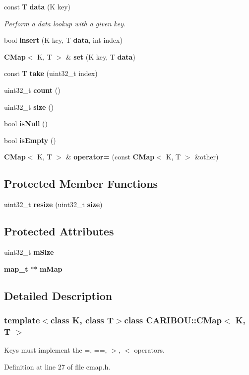 \begin{DoxyCompactItemize}
const T {\bf data} (K key)
\begin{DoxyCompactList}\small\item\em Perform a data lookup with a given key. \end{DoxyCompactList}\item 
bool {\bf insert} (K key, T {\bf data}, int index)
\item 
{\bf C\-Map}$<$ K, T $>$ \& {\bf set} (K key, T {\bf data})
\item 
const T {\bf take} (uint32\-\_\-t index)
\item 
uint32\-\_\-t {\bf count} ()
\item 
uint32\-\_\-t {\bf size} ()
\item 
bool {\bf is\-Null} ()
\item 
bool {\bf is\-Empty} ()
\item 
{\bf C\-Map}$<$ K, T $>$ \& {\bf operator=} (const {\bf C\-Map}$<$ K, T $>$ \&other)
\end{DoxyCompactItemize}
\subsection*{Protected Member Functions}
\begin{DoxyCompactItemize}
\item 
uint32\-\_\-t {\bf resize} (uint32\-\_\-t {\bf size})
\end{DoxyCompactItemize}
\subsection*{Protected Attributes}
\begin{DoxyCompactItemize}
\item 
uint32\-\_\-t {\bf m\-Size}
\item 
{\bf map\-\_\-t} $\ast$$\ast$ {\bf m\-Map}
\end{DoxyCompactItemize}


\subsection{Detailed Description}
\subsubsection*{template$<$class K, class T$>$class C\-A\-R\-I\-B\-O\-U\-::\-C\-Map$<$ K, T $>$}

Keys must implement the =, ==, $>$, $<$ operators. 

Definition at line 27 of file cmap.\-h.



